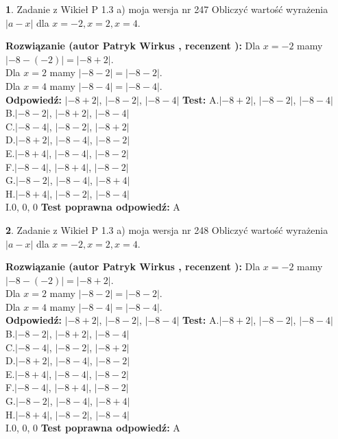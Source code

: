 \documentclass[12pt, a4paper]{article}
\theoremstyle{definition} %
\newtheorem{zad}{}
\newcommand{\zadStart}[1]{\begin{zad}#1\newline}
\newcommand{\zadStop}{\end{zad}}
\newcommand{\rozwStart}[2]{\noindent \textbf{Rozwiązanie (autor #1 , recenzent #2): }\newline}
\newcommand{\rozwStop}{\newline}
\newcommand{\odpStart}{\noindent \textbf{Odpowiedź:}\newline}
\newcommand{\odpStop}{\newline}
\newcommand{\testStart}{\noindent \textbf{Test:}\newline}
\newcommand{\testStop}{\newline}
\newcommand{\kluczStart}{\noindent \textbf{Test poprawna odpowiedź:}\newline}
\newcommand{\kluczStop}{\newline}
\begin{document}
\zadStart{Zadanie z Wikieł P 1.3 a) moja wersja nr 247}
Obliczyć wartość wyrażenia $|a - x|$ dla $x=-2,x=2,x=4$.
\zadStop
\rozwStart{Patryk Wirkus}{}
Dla $x = -2$ mamy $|-8 - (-2)| = |-8 + 2|$.\\
Dla $x = 2$ mamy $|-8 - 2| = |-8 - 2|$.\\
Dla $x = 4$ mamy $|-8 - 4| = |-8 - 4|$.\\
\rozwStop
\odpStart
$|-8 + 2|$, $|-8 - 2|$, $|-8 - 4|$
\odpStop
\testStart
A.$|-8 + 2|$, $|-8 - 2|$, $|-8 - 4|$\\
B.$|-8 - 2|$, $|-8 + 2|$, $|-8 - 4|$\\
C.$|-8 - 4|$, $|-8 - 2|$, $|-8 + 2|$\\
D.$|-8 + 2|$, $|-8 - 4|$, $|-8 - 2|$\\
E.$|-8 + 4|$, $|-8 - 4|$, $|-8 - 2|$\\
F.$|-8 - 4|$, $|-8 + 4|$, $|-8 - 2|$\\
G.$|-8 - 2|$, $|-8 - 4|$, $|-8 + 4|$\\
H.$|-8 + 4|$, $|-8 - 2|$, $|-8 - 4|$\\
I.$0$, $0$, $0$
\testStop
\kluczStart
A
\kluczStop



\zadStart{Zadanie z Wikieł P 1.3 a) moja wersja nr 248}
Obliczyć wartość wyrażenia $|a - x|$ dla $x=-2,x=2,x=4$.
\zadStop
\rozwStart{Patryk Wirkus}{}
Dla $x = -2$ mamy $|-8 - (-2)| = |-8 + 2|$.\\
Dla $x = 2$ mamy $|-8 - 2| = |-8 - 2|$.\\
Dla $x = 4$ mamy $|-8 - 4| = |-8 - 4|$.\\
\rozwStop
\odpStart
$|-8 + 2|$, $|-8 - 2|$, $|-8 - 4|$
\odpStop
\testStart
A.$|-8 + 2|$, $|-8 - 2|$, $|-8 - 4|$\\
B.$|-8 - 2|$, $|-8 + 2|$, $|-8 - 4|$\\
C.$|-8 - 4|$, $|-8 - 2|$, $|-8 + 2|$\\
D.$|-8 + 2|$, $|-8 - 4|$, $|-8 - 2|$\\
E.$|-8 + 4|$, $|-8 - 4|$, $|-8 - 2|$\\
F.$|-8 - 4|$, $|-8 + 4|$, $|-8 - 2|$\\
G.$|-8 - 2|$, $|-8 - 4|$, $|-8 + 4|$\\
H.$|-8 + 4|$, $|-8 - 2|$, $|-8 - 4|$\\
I.$0$, $0$, $0$
\testStop
\kluczStart
A
\kluczStop
\end{document}
